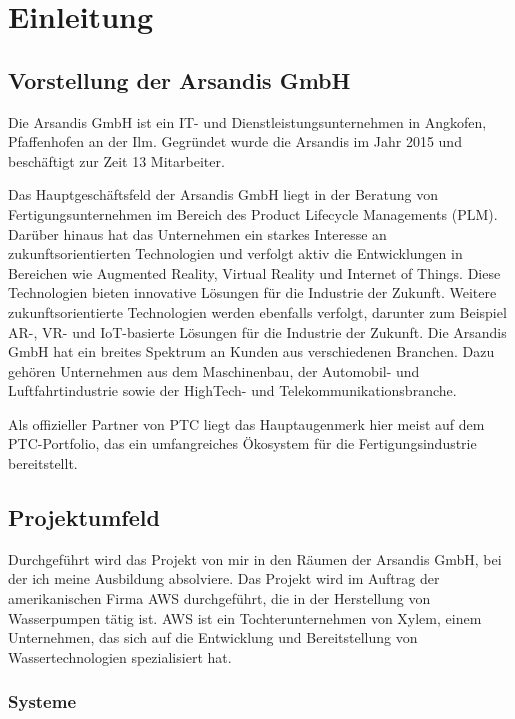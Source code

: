 \section{Einleitung}
\label{sec:Einleitung}

\subsection{Vorstellung der Arsandis GmbH}
\label{sec:Vorstellung_Arsandis}
Die Arsandis GmbH ist ein IT- und Dienstleistungsunternehmen in Angkofen, Pfaffenhofen an der Ilm.
Gegründet wurde die Arsandis im Jahr 2015 und beschäftigt zur Zeit 13 Mitarbeiter.

Das Hauptgeschäftsfeld der Arsandis GmbH liegt in der Beratung von Fertigungsunternehmen im Bereich des Product Lifecycle Managements (PLM).
Darüber hinaus hat das Unternehmen ein starkes Interesse an zukunftsorientierten Technologien und verfolgt aktiv die Entwicklungen in Bereichen wie Augmented Reality, Virtual Reality und Internet of Things.
Diese Technologien bieten innovative Lösungen für die Industrie der Zukunft.
Weitere zukunftsorientierte Technologien werden ebenfalls verfolgt, darunter zum Beispiel AR-, VR- und IoT-basierte Lösungen für die Industrie der Zukunft.
Die Arsandis GmbH hat ein breites Spektrum an Kunden aus verschiedenen Branchen.
Dazu gehören Unternehmen aus dem Maschinenbau, der Automobil- und Luftfahrtindustrie sowie der HighTech- und Telekommunikationsbranche.

Als offizieller Partner von PTC liegt das Hauptaugenmerk hier meist auf dem PTC-Portfolio, das ein umfangreiches Ökosystem für die Fertigungsindustrie bereitstellt.

\subsection{Projektumfeld}
\label{sec:Projektumfeld}
Durchgeführt wird das Projekt von mir in den Räumen der Arsandis GmbH, bei der ich meine Ausbildung absolviere.
Das Projekt wird im Auftrag der amerikanischen Firma \ac{AWS} durchgeführt, die in der Herstellung von Wasserpumpen tätig ist.
\ac{AWS} ist ein Tochterunternehmen von Xylem, einem Unternehmen, das sich auf die Entwicklung und Bereitstellung von Wassertechnologien spezialisiert hat.

\subsubsection{Systeme}


